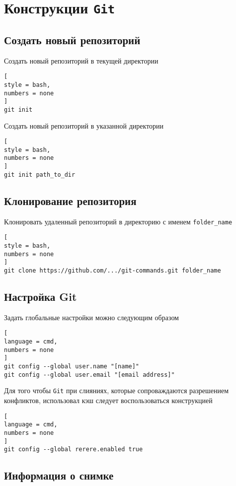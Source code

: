 \documentclass[%
	11pt,
	a4paper,
	utf8,
		]{article}
\begin{document}
\section{Конструкции \texttt{Git}}

\subsection{Создать новый репозиторий}

Создать новый репозиторий в текущей директории
\begin{lstlisting}[
style = bash,
numbers = none
]
git init
\end{lstlisting}

Создать новый репозиторий в указанной директории
\begin{lstlisting}[
style = bash,
numbers = none
]
git init path_to_dir
\end{lstlisting}

\subsection{Клонирование репозитория}

Клонировать удаленный репозиторий в директорию с именем \texttt{folder\_name}
\begin{lstlisting}[
style = bash,
numbers = none
]
git clone https://github.com/.../git-commands.git folder_name
\end{lstlisting}


\subsection{Настройка Git}

Задать глобальные настройки можно следующим образом

\begin{lstlisting}[
language = cmd,
numbers = none
]
git config --global user.name "[name]"
git config --global user.email "[email address]"
\end{lstlisting}

Для того чтобы \texttt{Git} при слияниях, которые сопроваждаются разрешением конфликтов, использовал кэш следует воспользоваться конструкцией

\begin{lstlisting}[
language = cmd,
numbers = none
]
git config --global rerere.enabled true
\end{lstlisting}

\subsection{Информация о снимке}
\end{document}
